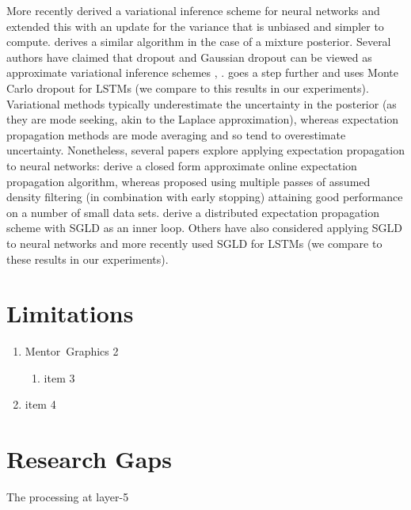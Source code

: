 More recently \citet{graves2011practical} derived a variational inference scheme for neural networks and
\cite{Blundell2015a} extended this with an update for the variance that is unbiased and simpler to compute.
\cite{Graves2016} derives a similar algorithm in the case of a mixture posterior.
Several authors have claimed that dropout \cite{Srivastava2014} and Gaussian dropout \cite{Wang2013} can be viewed as approximate variational inference schemes \cite{Gal2015}, \cite{Kingma2015}.
\cite{Gan2016} goes a step further and uses Monte Carlo dropout for LSTMs (we compare to this results in our experiments).
Variational methods typically underestimate the uncertainty in the posterior (as they are mode seeking, akin to the Laplace approximation), whereas expectation propagation methods are mode averaging and so tend to overestimate uncertainty.
Nonetheless, several papers explore applying expectation propagation to neural networks:
\cite{Soudry2014} derive a closed form approximate online expectation propagation algorithm, whereas \citet{hernandez2015probabilistic} proposed using multiple passes of assumed density filtering (in combination with early stopping) attaining good performance on a number of small data sets.
\citet{hasenclever2015distributed} derive a distributed expectation propagation scheme with SGLD \cite{Welling2011} as an inner loop.
Others have also considered applying SGLD to neural networks \citep{li2015preconditioned} and \cite{Gan2016} more recently used SGLD for LSTMs (we compare to these results in our experiments).

\section{Limitations}
\begin{enumerate}
\item Mentor~Graphics 2
\begin{enumerate}
\item item 3
\end{enumerate}
\item item 4
\end{enumerate}

\section{Research Gaps}
The processing at layer-5%

